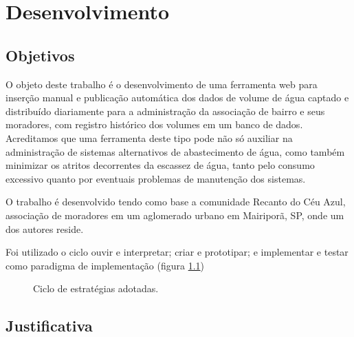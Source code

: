 
\chapter{Desenvolvimento}\label{chap:Desenvolvimento}

\section{Objetivos}\label{sec:Objetivos}

O objeto deste trabalho é o desenvolvimento de uma ferramenta web para inserção manual e publicação automática dos dados de volume de água captado e distribuído diariamente para a administração da associação de bairro e seus moradores, com registro histórico dos volumes em um banco de dados. Acreditamos que uma ferramenta deste tipo pode não só auxiliar na administração de sistemas alternativos de abastecimento de água, como também minimizar os atritos decorrentes da escassez de água, tanto pelo consumo excessivo quanto por eventuais problemas de manutenção dos sistemas.

O trabalho é desenvolvido tendo como base a comunidade Recanto do Céu Azul, associação de moradores em um aglomerado urbano em Mairiporã, SP, onde um dos autores reside.

Foi utilizado o ciclo ouvir e interpretar; criar e prototipar; e implementar e testar como paradigma de implementação (figura \ref{fig:estrategiasAdotadas})


\begin{figure}[ht]

    \centering
    \usetikzlibrary{shapes.geometric}
    \caption{Ciclo de estratégias adotadas.}
    \label{fig:estrategiasAdotadas}

\end{figure}


\section{Justificativa}\label{sec:Justificativa}
